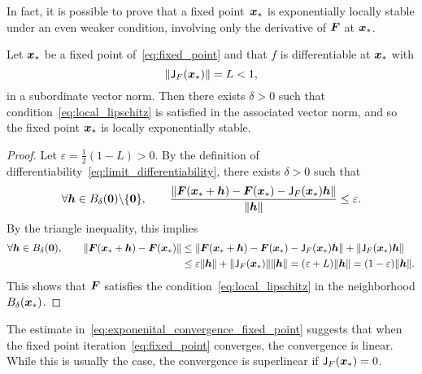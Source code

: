 In fact, it is possible to prove that a fixed point~$\mathbf{\boldsymbol{x}}_*$ is exponentially locally stable under an even weaker condition,
involving only the derivative of $\mathbf{\boldsymbol{F}}$ at $\mathbf{\boldsymbol{x}}_*$.
\begin{proposition}
    \label{proposition:local_convergence}
    Let $\mathbf{\boldsymbol{x}}_*$ be a fixed point of~\eqref{eq:fixed_point} and that $f$ is differentiable at $\mathbf{\boldsymbol{x}}_*$ with
    \[
        \lVert\mathsf J_F(\mathbf{\boldsymbol{x}}_*)\rVert = L < 1,
    \]
    in a subordinate vector norm.
    Then there exists $\delta > 0$ such that condition~\eqref{eq:local_lipschitz} is satisfied in the associated vector norm,
    and so the fixed point $\mathbf{\boldsymbol{x}}_*$ is locally exponentially stable.
\end{proposition}
\begin{proof}
    Let $\varepsilon = \frac{1}{2} (1-L) > 0$.
    By the definition of differentiability~\eqref{eq:limit_differentiability},
    there exists $\delta > 0$ such that
    \[
        \forall \mathbf{\boldsymbol{h}} \in B_{\delta} (\mathbf{\boldsymbol{0}}) \backslash \{ \mathbf{\boldsymbol{0}} \}, \qquad
        \frac{\lVert\mathbf{\boldsymbol{F}}(\mathbf{\boldsymbol{x}}_* + \mathbf{\boldsymbol{h}}) - \mathbf{\boldsymbol{F}}(\mathbf{\boldsymbol{x}}_*) - \mathsf J_F(\mathbf{\boldsymbol{x}}_*)\mathbf{\boldsymbol{h}}\rVert}{\lVert\mathbf{\boldsymbol{h}}\rVert} \leq \varepsilon.
    \]
    By the triangle inequality,
    this implies
    \begin{align*}
        \forall \mathbf{\boldsymbol{h}} \in B_{\delta} (\mathbf{\boldsymbol{0}}), \qquad
        \lVert\mathbf{\boldsymbol{F}}(\mathbf{\boldsymbol{x}}_* + \mathbf{\boldsymbol{h}}) - \mathbf{\boldsymbol{F}}(\mathbf{\boldsymbol{x}}_*)\rVert
        &\leq
        \lVert\mathbf{\boldsymbol{F}}(\mathbf{\boldsymbol{x}}_* + \mathbf{\boldsymbol{h}}) - \mathbf{\boldsymbol{F}}(\mathbf{\boldsymbol{x}}_*) - \mathsf J_F(\mathbf{\boldsymbol{x}}_*)\mathbf{\boldsymbol{h}}\rVert + \lVert\mathsf J_F(\mathbf{\boldsymbol{x}}_*)\mathbf{\boldsymbol{h}}\rVert \\
        &\leq
        \varepsilon \lVert\mathbf{\boldsymbol{h}}\rVert + \lVert\mathsf J_F(\mathbf{\boldsymbol{x}}_*)\rVert \lVert\mathbf{\boldsymbol{h}}\rVert
        = (\varepsilon + L) \lVert\mathbf{\boldsymbol{h}}\rVert = (1 - \varepsilon) \lVert\mathbf{\boldsymbol{h}}\rVert.
    \end{align*}
    This shows that $\mathbf{\boldsymbol{F}}$ satisfies the condition~\eqref{eq:local_lipschitz} in the neighborhood $B_{\delta}(\mathbf{\boldsymbol{x}}_*)$.
\end{proof}

The estimate in~\cref{eq:exponenital_convergence_fixed_point} suggests that
when the fixed point iteration~\eqref{eq:fixed_point} converges,
the convergence is linear.
While this is usually the case,
the convergence is superlinear if $\mathsf J_F(\mathbf{\boldsymbol{x}}_*) = 0$.


